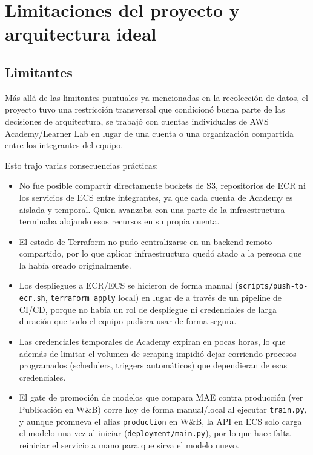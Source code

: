 \documentclass[letterpaper,12pt]{article}
\begin{document}
\newpage
\section{Limitaciones del proyecto y arquitectura ideal}

\subsection{Limitantes}

Más allá de las limitantes puntuales ya mencionadas en la recolección de datos, el proyecto tuvo una restricción transversal que condicionó buena parte de las decisiones de arquitectura, se trabajó con cuentas individuales de AWS Academy/Learner Lab en lugar de una cuenta o una organización compartida entre los integrantes del equipo.

Esto trajo varias consecuencias prácticas:

\begin{itemize}
    \item No fue posible compartir directamente buckets de S3, repositorios de ECR ni los servicios de ECS entre integrantes, ya que cada cuenta de Academy es aislada y temporal. Quien avanzaba con una parte de la infraestructura terminaba alojando esos recursos en su propia cuenta.
    \item El estado de Terraform no pudo centralizarse en un backend remoto compartido, por lo que aplicar infraestructura quedó atado a la persona que la había creado originalmente.
    \item Los despliegues a ECR/ECS se hicieron de forma manual (\texttt{scripts/push-to-ecr.sh}, \texttt{terraform apply} local) en lugar de a través de un pipeline de CI/CD, porque no había un rol de despliegue ni credenciales de larga duración que todo el equipo pudiera usar de forma segura.
    \item Las credenciales temporales de Academy expiran en pocas horas, lo que además de limitar el volumen de scraping impidió dejar corriendo procesos programados (schedulers, triggers automáticos) que dependieran de esas credenciales.
    \item El gate de promoción de modelos que compara MAE contra producción (ver Publicación en W\&B) corre hoy de forma manual/local al ejecutar \texttt{train.py}, y aunque promueva el alias \texttt{production} en W\&B, la API en ECS solo carga el modelo una vez al iniciar (\texttt{deployment/main.py}), por lo que hace falta reiniciar el servicio a mano para que sirva el modelo nuevo.
\end{itemize}
\end{document}
